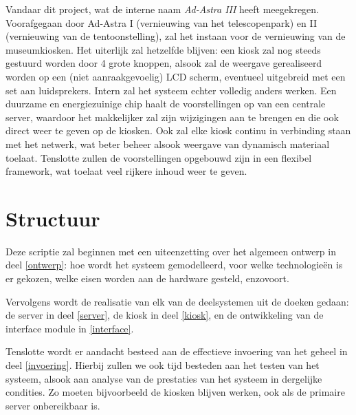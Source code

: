 Vandaar dit project, wat de interne naam \emph{Ad-Astra III} heeft meegekregen. Voorafgegaan door Ad-Astra I (vernieuwing van het telescopenpark) en II (vernieuwing van de tentoonstelling), zal het instaan voor de vernieuwing van de museumkiosken. Het uiterlijk zal hetzelfde blijven: een kiosk zal nog steeds gestuurd worden door 4 grote knoppen, alsook zal de weergave gerealiseerd worden op een (niet aanraakgevoelig) LCD scherm, eventueel uitgebreid met een set aan luidsprekers.
Intern zal het systeem echter volledig anders werken. Een duurzame en energiezuinige chip haalt de voorstellingen op van een centrale server, waardoor het makkelijker zal zijn wijzigingen aan te brengen en die ook direct weer te geven op de kiosken. Ook zal elke kiosk continu in verbinding staan met het netwerk, wat beter beheer alsook weergave van dynamisch materiaal toelaat. Tenslotte zullen de voorstellingen opgebouwd zijn in een flexibel framework, wat toelaat veel rijkere inhoud weer te geven.


%
%

\chapter{Structuur}
\label{chat:structuur}

Deze scriptie zal beginnen met een uiteenzetting over het algemeen ontwerp in deel \ref{ontwerp}: hoe wordt het systeem gemodelleerd, voor welke technologieën is er gekozen, welke eisen worden aan de hardware gesteld, enzovoort.

Vervolgens wordt de realisatie van elk van de deelsystemen uit de doeken gedaan: de server in deel \ref{server}, de kiosk in deel \ref{kiosk}, en de ontwikkeling van de interface module in \ref{interface}.

Tenslotte wordt er aandacht besteed aan de effectieve invoering van het geheel in deel \ref{invoering}. Hierbij zullen we ook tijd besteden aan het testen van het systeem, alsook aan analyse van de prestaties van het systeem in dergelijke condities. Zo moeten bijvoorbeeld de kiosken blijven werken, ook als de primaire server onbereikbaar is.
